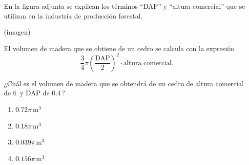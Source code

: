 \begin{problem}
    En la figura adjunta se explican los términos “DAP” y “altura comercial” que se utilizan en la industria de producción forestal.

    \begin{center}
    (imagen)
    \end{center}

    El volumen de madera que se obtiene de un cedro se calcula con la expresión
    \[
    \frac{3}{4}\pi \left(\frac{\text{DAP}}{2}\right)^2 \cdot \text{altura comercial}.
    \]

    ¿Cuál es el volumen de madera que se obtendrá de un cedro de altura comercial de 6\, y DAP de 0.4\,?

    \begin{enumerate}[label=\Alph*.]
        \item $0.72\pi\,\mathrm{m^3}$
        \item $0.18\pi\,\mathrm{m^3}$
        \item $0.039\pi\,\mathrm{m^3}$
        \item $0.156\pi\,\mathrm{m^3}$
    \end{enumerate}
\end{problem}
